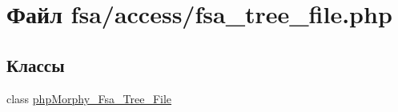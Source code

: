 \hypertarget{fsa__tree__file_8php}{
\section{Файл fsa/access/fsa\_\-tree\_\-file.php}
\label{fsa__tree__file_8php}
}
\subsection*{Классы}
\begin{DoxyCompactItemize}
\item 
class \hyperlink{classphpMorphy__Fsa__Tree__File}{phpMorphy\_\-Fsa\_\-Tree\_\-File}
\end{DoxyCompactItemize}
